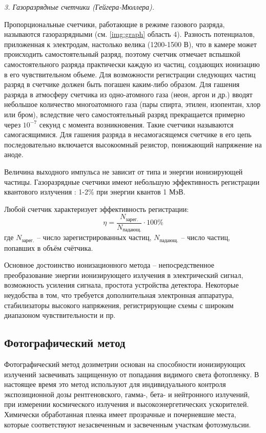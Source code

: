 \documentclass[14pt,pscyr,titlepage]{hedreport}
\begin{document}
		\emph{3. Газоразрядные счетчики (Гейгера-Мюллера). }

		Пропорциональные счетчики, работающие в режиме газового разряда, 
		называются газоразрядными (см. \ref{img:graph} область 4). Разность 
		потенциалов, приложенная  к электродам, настолько велика 
		(1200-1500 В), что в камере может происходить самостоятельный разряд, 
		поэтому счетчик отмечает вспышкой самостоятельного разряда практически 
		каждую из частиц, создающих ионизацию в его чувствительном объеме. Для 
		возможности регистрации следующих частиц разряд в счетчике должен 
		быть погашен каким-либо образом. Для гашения разряда в атмосферу 
		счетчика из одно-атомного газа (неон, аргон и  др.) вводят небольшое 
		количество многоатомного газа (пары спирта, этилен, изопентан, хлор 
		или бром), вследствие чего самостоятельный разряд прекращается 
		примерно через \( 10^{-7} \) секунд с момента возникновения. Такие 
		счетчики называются самогасящимися. Для гашения разряда в 
		несамогасящемся счетчике в его цепь последовательно включается 
		высокоомный резистор, понижающий напряжение на аноде. 

		Величина выходного импульса не зависит от типа и энергии ионизирующей 
		частицы. Газоразрядные счетчики имеют небольшую эффективность 
		регистрации квантового излучения : 1-2\% при энергии квантов 1 МэВ.

		Любой счетчик характеризует эффективность регистрации:
		\[
			\eta = \frac{N_\text{зарег.}}{N_\text{падающ.}}\cdot 100\%
		\]
		где \( N_\text{зарег.} \) -- число зарегистрированных частиц, 
		\( N_\text{падающ.} \) -- число частиц, попавших в объём счётчика.

		Основное достоинство ионизационного метода -- непосредственное 
		преобразование энергии ионизирующего излучения в электрический сигнал, 
		возможность усиления сигнала, простота устройства детектора. 
		Некоторые неудобства в том, что требуется дополнительная электронная 
		аппаратура, стабилизаторы высокого напряжения, регистрирующие схемы с 
		широким диапазоном чувствительности и пр.

	\subsection{Фотографический метод}
		Фотографический метод дозиметрии основан на способности ионизирующих 
		излучений засвечивать защищенную от попадания видимого света 
		фотопленку. В настоящее время это метод используют для индивидуального 
		контроля экспозиционной дозы рентгеновского, гамма-, бета- и 
		нейтронного излучений, при измерении космического излучения и 
		высокоэнергетических ускорителей. Химически обработанная пленка имеет 
		прозрачные и почерневшие места, которые соответствуют незасвеченным и 
		засвеченным участкам фотоэмульсии.
\end{document}
